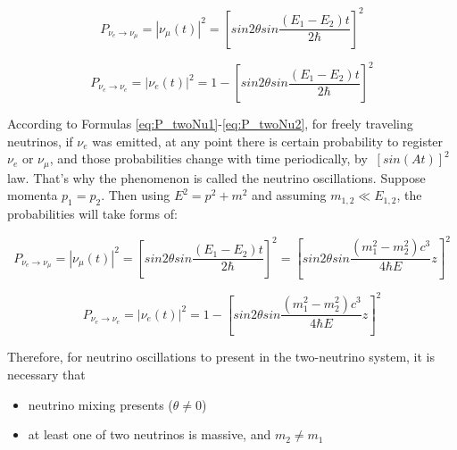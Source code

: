 \begin{center}

\begin{equation}
\label{eq:P_twoNu1}
P_{\nu_e \rightarrow \nu_\mu} = |\nu_\mu(t)|^2=[{sin2\theta}sin{\frac{(E_1-E_2)t}{2\hbar}}]^2
\end{equation}

\begin{equation}
\label{eq:P_twoNu2}
P_{\nu_e \rightarrow \nu_e}=|\nu_e(t)|^2=1-[{sin2\theta}sin{\frac{(E_1-E_2)t}{2\hbar}}]^2
\end{equation}

\end{center}

According to Formulas \ref{eq:P_twoNu1}-\ref{eq:P_twoNu2}, for freely traveling neutrinos, if $\nu_e$ was emitted, at any point there is certain probability to register $\nu_e$ or $\nu_\mu$, and those probabilities change with time periodically, by $~[sin(At)]^2$ law. That's why the phenomenon is called the neutrino oscillations.
Suppose momenta $p_1=p_2$. Then using $E^2=p^2+m^2$ and assuming $m_{1,2}\ll E_{1,2}$, the probabilities will take forms of:\\
\begin{center}

\begin{equation}
\label{eq:P_twoNu3}
P_{\nu_e \rightarrow \nu_\mu}=|\nu_\mu(t)|^2=[{sin2\theta}sin{\frac{(E_1-E_2)t}{2\hbar}}]^2=[{sin2\theta}sin{\frac{(m_1^2-m_2^2)c^3}{4\hbar{E}}z}]^2
\end{equation}

\begin{equation}
\label{eq:P_twoNu4}
P_{\nu_e \rightarrow \nu_e}=|\nu_e(t)|^2=1-[{sin2\theta}sin{\frac{(m_1^2-m_2^2)c^3}{4\hbar{E}}z}]^2
\end{equation}

\end{center}

Therefore, for neutrino oscillations to present in the two-neutrino system, it is necessary that
\begin{itemize}
  \item {neutrino mixing presents ($\theta \neq 0$)}
  \item {at least one of two neutrinos is massive, and $m_2 \neq m_1$}
\end{itemize}


